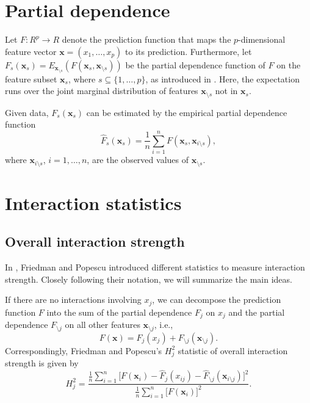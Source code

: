 \documentclass[]{article}
\title{}
\author{}
\begin{document}
\section{Partial dependence}
Let $F: R^p \to R$ denote the prediction function that maps the $p$-dimensional feature vector $\mathbf{x} = (x_1, \dots, x_p)$ to its prediction.
Furthermore, let $F_s(\mathbf{x}_s) = E_{\mathbf{x}_{\setminus s}}(F(\mathbf{x}_s, \mathbf{x}_{\setminus s}))$ be the partial dependence function of $F$ on the feature subset $\mathbf{x}_s$, where $s \subseteq \{1, \dots, p\}$, as introduced in \cite{friedman2001}. Here, the expectation runs over the joint marginal distribution of features $\mathbf{x}_{\setminus s}$ not in $\mathbf{x}_s$.

Given data, $F_s(\mathbf{x}_s)$ can be estimated by the empirical partial dependence function
$$
  \hat F_s(\mathbf{x}_s) = \frac{1}{n} \sum_{i = 1}^n F(\mathbf{x}_s, \mathbf{x}_{i\setminus s}),
$$
where $\mathbf{x}_{i\setminus s}$, $i = 1, \dots, n$, are the observed values of $\mathbf{x}_{\setminus s}$.

\section{Interaction statistics}

\subsection{Overall interaction strength}
In \cite{friedman2008}, Friedman and Popescu introduced different statistics to measure interaction strength. Closely following their notation, we will summarize the main ideas. 

If there are no interactions involving $x_j$, we can decompose the prediction function $F$ into the sum of the partial dependence $F_j$ on $x_j$ and the partial dependence $F_{\setminus j}$ on all other features $\mathbf{x}_{\setminus j}$, i.e.,
$$
	F(\mathbf{x}) = F_j(x_j) + F_{\setminus j}(\mathbf{x}_{\setminus j}).
$$
Correspondingly, Friedman and Popescu's $H^2_j$ statistic of overall interaction strength is given by
$$
	H_{j}^2 = \frac{\frac{1}{n} \sum_{i = 1}^n\big[F(\mathbf{x}_i) - \hat F_j(x_{ij}) - \hat F_{\setminus j}(\mathbf{x}_{i\setminus j})\big]^2}{\frac{1}{n} \sum_{i = 1}^n\big[F(\mathbf{x}_i)\big]^2}.
$$
\end{document}
